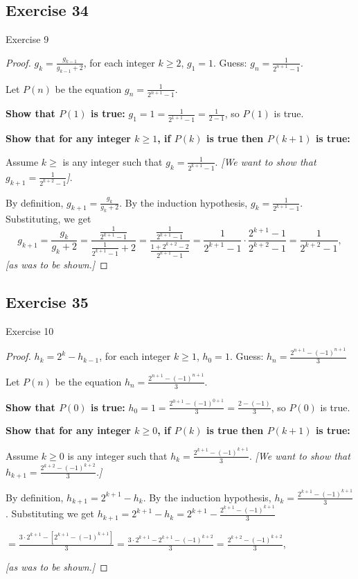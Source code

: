 \documentclass[14pt]{extarticle}
\newcommand{\dps}{\displaystyle}
\begin{document}
\subsection{Exercise 34}
Exercise 9

\begin{proof}
    \(g_k = \dps \frac{g_{k-1}}{g_{k-1} + 2}\), for each integer \(k \geq 2\), \(g_1 = 1\).
    Guess: \(\dps g_n = \frac{1}{2^{n+1} - 1}\).

    Let $P(n)$ be the equation \(\dps g_n = \frac{1}{2^{n+1} - 1}\).

        {\bf Show that \(P(1)\) is true:} \(\dps g_1 = 1 = \frac{1}{2^{1+1} - 1} = \frac{1}{2-1}\), so $P(1)$ is true.

        {\bf Show that for any integer \(k \geq 1\), if \(P(k)\) is true then \(P(k+1)\) is true:}

    Assume \(k \geq \) is any integer such that \(\dps g_k = \frac{1}{2^{k+1} - 1}\).
        {\it [We want to show that \(\dps g_{k+1} = \frac{1}{2^{k+2} - 1}\)]}.

    By definition, \(g_{k+1} = \dps \frac{g_k}{g_k + 2}\).
    By the induction hypothesis, \(\dps g_k = \frac{1}{2^{k+1} - 1}\).
    Substituting, we get
    \[
        g_{k+1} = \frac{g_k}{g_k + 2} = \frac{\frac{1}{2^{k+1} - 1}}{\frac{1}{2^{k+1} - 1} + 2}
        = \frac{\frac{1}{2^{k+1} - 1}}{\frac{1 + 2^{k+2} - 2}{2^{k+1} - 1}}
        = \frac{1}{2^{k+1} - 1} \cdot \frac{2^{k+1} - 1}{2^{k+2} - 1} = \frac{1}{2^{k+2} - 1},
    \]
    {\it [as was to be shown.]}
\end{proof}

\subsection{Exercise 35}
Exercise 10

\begin{proof}
    \(h_k = 2^k - h_{k-1}\), for each integer \(k \geq 1\), \(h_0 = 1\).
    Guess: \(\dps h_n = \frac{2^{n+1} - (-1)^{n+1}}{3}\)

    Let $P(n)$ be the equation \(\dps h_n = \frac{2^{n+1} - (-1)^{n+1}}{3}\).

        {\bf Show that \(P(0)\) is true:} \(h_0 = 1 = \frac{2^{0+1} - (-1)^{0+1}}{3} = \frac{2 -(-1)}{3}\), so $P(0)$ is true.

        {\bf Show that for any integer \(k \geq 0\), if \(P(k)\) is true then \(P(k+1)\) is true:}

    Assume \(k \geq 0\) is any integer such that \(\dps h_k = \frac{2^{k+1} - (-1)^{k+1}}{3}\).
        {\it [We want to show that \(\dps h_{k+1} = \frac{2^{k+2} - (-1)^{k+2}}{3}\).]}

    By definition, \(h_{k+1} = 2^{k+1} - h_k\).
    By the induction hypothesis, \(\dps h_k = \frac{2^{k+1} - (-1)^{k+1}}{3}\).
    Substituting we get \(h_{k+1} = 2^{k+1} - h_k = \dps 2^{k+1} - \frac{2^{k+1} - (-1)^{k+1}}{3}\)

    \(\dps = \frac{3 \cdot 2^{k+1} - [2^{k+1} - (-1)^{k+1}]}{3} =  \frac{3 \cdot 2^{k+1} - 2^{k+1} - (-1)^{k+2}}{3} =
    \frac{2^{k+2} - (-1)^{k+2}}{3}\),

    {\it [as was to be shown.]}
\end{proof}
\end{document}

